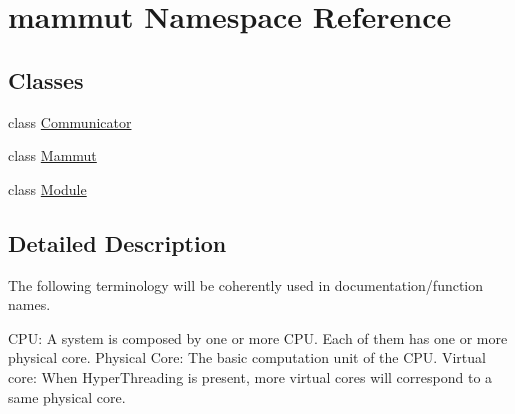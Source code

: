 \hypertarget{namespacemammut}{\section{mammut Namespace Reference}
\label{namespacemammut}
}
\subsection*{Classes}
\begin{DoxyCompactItemize}
\item 
class \hyperlink{classmammut_1_1Communicator}{Communicator}
\item 
class \hyperlink{classmammut_1_1Mammut}{Mammut}
\item 
class \hyperlink{classmammut_1_1Module}{Module}
\end{DoxyCompactItemize}


\subsection{Detailed Description}
The following terminology will be coherently used in documentation/function names.

C\-P\-U\-: A system is composed by one or more C\-P\-U. Each of them has one or more physical core. Physical Core\-: The basic computation unit of the C\-P\-U. Virtual core\-: When Hyper\-Threading is present, more virtual cores will correspond to a same physical core. 